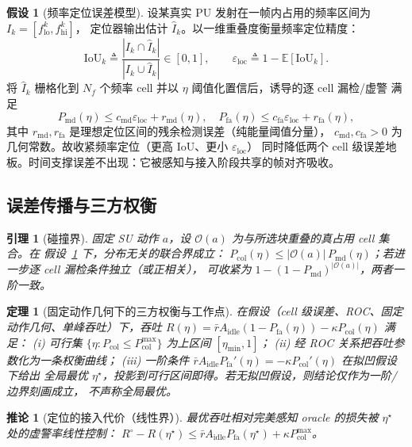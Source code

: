 \documentclass[11pt,a4paper]{article}
\theoremstyle{plain}
\newtheorem{theorem}{定理}
\newtheorem{corollary}{推论}
\newtheorem{lemma}{引理}
\theoremstyle{definition}
\newtheorem{assumption}{假设}
\newcommand{\Pmd}{P_{\mathrm{md}}}
\newcommand{\Pfa}{P_{\mathrm{fa}}}
\newcommand{\Pcol}{P_{\mathrm{col}}}
\newcommand{\thr}{\eta}
\newcommand{\eloc}{\varepsilon_{\mathrm{loc}}}
\newcommand{\E}{\mathbb{E}}
\newcommand{\defeq}{\triangleq}
\begin{document}
\begin{assumption}[频率定位误差模型]
\label{as:loc}
设某真实 PU 发射在一帧内占用的频率区间为 $I_k=[f_{\mathrm{lo}}^k,f_{\mathrm{hi}}^k]$，
定位器输出估计 $\hat I_k$。以一维重叠度衡量频率定位精度：
\[
\mathrm{IoU}_k\!\defeq\!\frac{|I_k\cap\hat I_k|}{|I_k\cup\hat I_k|}\in[0,1],
\qquad \eloc\defeq 1-\E[\mathrm{IoU}_k].
\]
将 $\hat I_k$ 栅格化到 $N_f$ 个频率 cell 并以 $\thr$ 阈值化置信后，诱导的逐 cell 漏检/虚警
满足
\begin{equation}
\Pmd(\thr)\le c_{\mathrm{md}}\eloc+r_{\mathrm{md}}(\thr),\quad
\Pfa(\thr)\le c_{\mathrm{fa}}\eloc+r_{\mathrm{fa}}(\thr),
\label{eq:loc2cell}
\end{equation}
其中 $r_{\mathrm{md}},r_{\mathrm{fa}}$ 是理想定位区间的残余检测误差（纯能量阈值分量），
$c_{\mathrm{md}},c_{\mathrm{fa}}>0$ 为几何常数。故收紧频率定位（更高 IoU、更小 $\eloc$）
同时降低两个 cell 级误差地板。时间支撑误差不出现：它被感知与接入阶段共享的帧对齐吸收。
\end{assumption}

\subsection{误差传播与三方权衡}

\begin{lemma}[碰撞界]
\label{lem:col}
固定 SU 动作 $a$，设 $\mathcal{O}(a)$ 为与所选块重叠的真占用 cell 集合。在
假设~\ref{as:loc} 下，分布无关的联合界成立：
$\Pcol(\thr)\le|\mathcal{O}(a)|\,\Pmd(\thr)$；若进一步逐 cell 漏检条件独立（或正相关），
可收紧为 $1-(1-\Pmd)^{|\mathcal{O}(a)|}$，两者一阶一致。
\end{lemma}

\begin{theorem}[固定动作几何下的三方权衡与工作点]
\label{thm:trade}
在假设（cell 级误差、ROC、固定动作几何、单峰吞吐）下，吞吐
$R(\thr)=\bar r A_{\mathrm{idle}}(1-\Pfa(\thr))-\kappa\Pcol(\thr)$ 满足：
(i) 可行集 $\{\thr:\Pcol\le\Pcol^{\max}\}$ 为上区间 $[\thr_{\min},1]$；
(ii) 经 ROC 关系把吞吐参数化为一条权衡曲线；
(iii) 一阶条件 $\bar r A_{\mathrm{idle}}\Pfa'(\thr)=-\kappa\Pcol'(\thr)$ 在拟凹假设下给出
全局最优 $\thr^\star$，投影到可行区间即得。若无拟凹假设，则结论仅作为一阶/边界刻画成立，
不声称全局最优。
\end{theorem}

\begin{corollary}[定位的接入代价（线性界）]
\label{cor:price}
最优吞吐相对完美感知 oracle 的损失被 $\thr^\star$ 处的虚警率线性控制：
$R^\circ-R(\thr^\star)\le \bar r A_{\mathrm{idle}}\Pfa(\thr^\star)+\kappa\Pcol^{\max}$。
\end{corollary}
\end{document}
